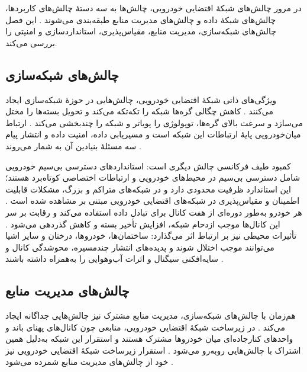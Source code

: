 \documentclass[12pt,a4paper]{article}
\begin{document}
در مرور چالش‌های شبکهٔ اقتضایی خودرویی، چالش‌ها به سه دستهٔ چالش‌های کاربردها، چالش‌های شبکهٔ داده و چالش‌های مدیریت منابع طبقه‌بندی می‌شوند \cite{hozouriOverviewVANETVehicular2023}. این فصل چالش‌های شبکه‌سازی، مدیریت منابع، مقیاس‌پذیری، استانداردسازی و امنیتی را بررسی می‌کند.

\subsection{چالش‌های شبکه‌سازی}

ویژگی‌های ذاتی شبکهٔ اقتضایی خودرویی، چالش‌هایی در حوزهٔ شبکه‌سازی ایجاد می‌کنند \cite{hozouriOverviewVANETVehicular2023}. کاهش چگالی گره‌ها شبکه را تکه‌تکه می‌کند و تحویل بسته‌ها را مختل می‌سازد و سرعت بالای گره‌ها، توپولوژی را پویاتر و شبکه را چندبخشی می‌کند \cite{hozouriOverviewVANETVehicular2023}. ارتباط میان‌خودرویی  پایهٔ ارتباطات این شبکه است و مسیریابی داده، امنیت داده و انتشار پیام سه مسئلهٔ بنیادین آن به شمار می‌روند \cite{hozouriOverviewVANETVehicular2023}.

کمبود طیف فرکانسی چالش دیگری است: استاندارد‌های دسترسی بی‌سیم خودرویی شامل دسترسی بی‌سیم در محیط‌های خودرویی  و ارتباطات اختصاصی کوتاه‌برد  هستند؛ این استاندارد ظرفیت محدودی دارد و در شبکه‌های متراکم و بزرگ، مشکلات قابلیت اطمینان و مقیاس‌پذیری در شبکه‌های اقتضایی خودرویی مبتنی بر  مشاهده شده است \cite{hozouriOverviewVANETVehicular2023}. هر خودرو به‌طور دوره‌ای از هفت کانال  برای تبادل داده استفاده می‌کند و رقابت بر سر این کانال‌ها موجب ازدحام شبکه، افزایش تأخیر بسته و کاهش گذردهی می‌شود \cite{hozouriOverviewVANETVehicular2023}. تأثیرات محیطی نیز بر ارتباط اثر می‌گذارد: ساختمان‌ها، خودروها، درختان و سایر اشیا می‌توانند موجب اختلال شوند و پدیده‌های انتشار چندمسیره، محوشدگی کانال و سایه‌افکنی سیگنال و اثرات آب‌وهوایی را به‌همراه داشته باشند \cite{hozouriOverviewVANETVehicular2023}.

\subsection{چالش‌های مدیریت منابع}

هم‌زمان با چالش‌های شبکه‌سازی، مدیریت منابع مشترک نیز چالش‌هایی جداگانه ایجاد می‌کند \cite{hozouriOverviewVANETVehicular2023}. در زیرساخت شبکهٔ اقتضایی خودرویی، منابعی چون کانال‌های پهنای باند و واحد‌های کنارجاده‌ای  میان خودرو‌ها مشترک هستند و استقرار این شبکه به‌دلیل همین اشتراک با چالش‌هایی روبه‌رو می‌شود \cite{hozouriOverviewVANETVehicular2023}. استقرار زیرساخت شبکهٔ اقتضایی خودرویی نیز خود از چالش‌های مدیریت منابع شمرده می‌شود \cite{hozouriOverviewVANETVehicular2023}.
\end{document}
